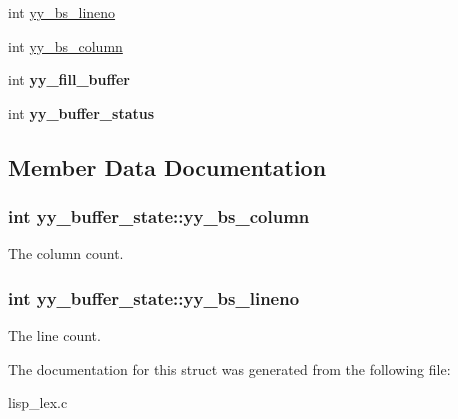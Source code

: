 \begin{DoxyCompactItemize}
\item 
int \hyperlink{structyy__buffer__state_a818e94bc9c766e683c60df1e9fd01199}{yy\-\_\-bs\-\_\-lineno}
\item 
int \hyperlink{structyy__buffer__state_a10c4fcd8be759e6bf11e6d3e8cdb0307}{yy\-\_\-bs\-\_\-column}
\item 
\hypertarget{structyy__buffer__state_a63d2afbb1d79a3fc63df9e12626f827d}{int {\bfseries yy\-\_\-fill\-\_\-buffer}}\label{structyy__buffer__state_a63d2afbb1d79a3fc63df9e12626f827d}

\item 
\hypertarget{structyy__buffer__state_a70fd925d37a2f0454fbd0def675d106c}{int {\bfseries yy\-\_\-buffer\-\_\-status}}\label{structyy__buffer__state_a70fd925d37a2f0454fbd0def675d106c}

\end{DoxyCompactItemize}


\subsection{Member Data Documentation}
\hypertarget{structyy__buffer__state_a10c4fcd8be759e6bf11e6d3e8cdb0307}{
\subsubsection[{yy\-\_\-bs\-\_\-column}]{\setlength{\rightskip}{0pt plus 5cm}int yy\-\_\-buffer\-\_\-state\-::yy\-\_\-bs\-\_\-column}}\label{structyy__buffer__state_a10c4fcd8be759e6bf11e6d3e8cdb0307}
The column count. \hypertarget{structyy__buffer__state_a818e94bc9c766e683c60df1e9fd01199}{
\subsubsection[{yy\-\_\-bs\-\_\-lineno}]{\setlength{\rightskip}{0pt plus 5cm}int yy\-\_\-buffer\-\_\-state\-::yy\-\_\-bs\-\_\-lineno}}\label{structyy__buffer__state_a818e94bc9c766e683c60df1e9fd01199}
The line count. 

The documentation for this struct was generated from the following file\-:\begin{DoxyCompactItemize}
\item 
lisp\-\_\-lex.\-c\end{DoxyCompactItemize}
